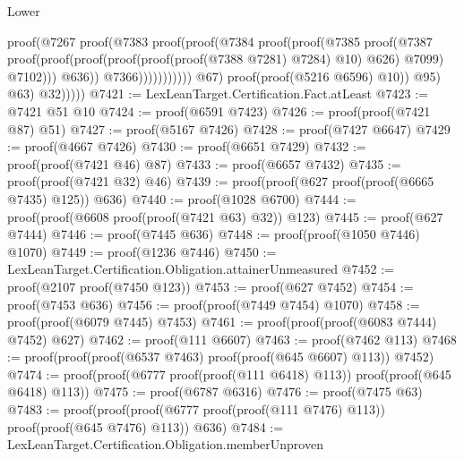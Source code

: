 \begin{lexlean}{Lower}
\begin{coremodule}
                                            proof(@7267
                                                proof(@7383
                                                    proof(proof(@7384
                                                          proof(proof(@7385
                                                                proof(@7387
                                                                    proof(proof(proof(proof(proof(proof(@7388
                                                                                  @7281)
                                                                                @7284)
                                                                              @10)
                                                                            @626)
                                                                          @7099)
                                                                        @7102)))
                                                              @636))
                                                        @7366)))))))))))
                        @67)
                      proof(proof(@5216 @6596) @10))
                    @95)
                  @63)
                @32)))))
@7421 := LexLeanTarget.Certification.Fact.atLeast
@7423 := @7421 @51 @10
@7424 := proof(@6591 @7423)
@7426 := proof(proof(@7421 @87) @51)
@7427 := proof(@5167 @7426)
@7428 := proof(@7427 @6647)
@7429 := proof(@4667 @7426)
@7430 := proof(@6651 @7429)
@7432 := proof(proof(@7421 @46) @87)
@7433 := proof(@6657 @7432)
@7435 := proof(proof(@7421 @32) @46)
@7439 := proof(proof(@627 proof(proof(@6665 @7435) @125)) @636)
@7440 := proof(@1028 @6700)
@7444 := proof(proof(@6608 proof(proof(@7421 @63) @32)) @123)
@7445 := proof(@627 @7444)
@7446 := proof(@7445 @636)
@7448 := proof(proof(@1050 @7446) @1070)
@7449 := proof(@1236 @7446)
@7450 := LexLeanTarget.Certification.Obligation.attainerUnmeasured
@7452 := proof(@2107 proof(@7450 @123))
@7453 := proof(@627 @7452)
@7454 := proof(@7453 @636)
@7456 := proof(proof(@7449 @7454) @1070)
@7458 := proof(proof(@6079 @7445) @7453)
@7461 := proof(proof(proof(@6083 @7444) @7452) @627)
@7462 := proof(@111 @6607)
@7463 := proof(@7462 @113)
@7468 := proof(proof(proof(@6537 @7463) proof(proof(@645 @6607) @113)) @7452)
@7474 := proof(proof(@6777 proof(proof(@111 @6418) @113)) proof(proof(@645 @6418) @113))
@7475 := proof(@6787 @6316)
@7476 := proof(@7475 @63)
@7483 := proof(proof(proof(@6777 proof(proof(@111 @7476) @113)) proof(proof(@645 @7476) @113)) @636)
@7484 := LexLeanTarget.Certification.Obligation.memberUnproven

\end{coremodule}
\end{lexlean}
